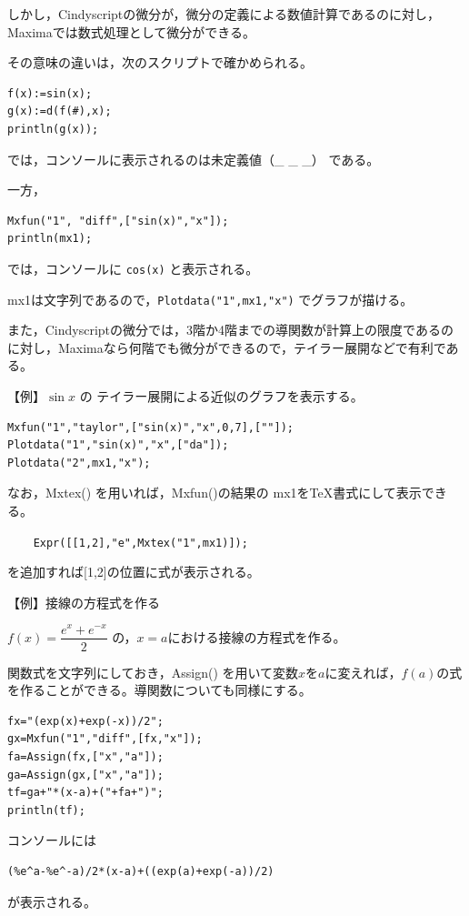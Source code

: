 \documentclass[papersize,a4paper,12pt,uplatex]{jsarticle}
\begin{document}
\begin{description}
しかし，Cindyscriptの微分が，微分の定義による数値計算であるのに対し，Maximaでは数式処理として微分ができる。

その意味の違いは，次のスクリプトで確かめられる。
\begin{verbatim}
f(x):=sin(x);
g(x):=d(f(#),x);
println(g(x));
\end{verbatim}
では，コンソールに表示されるのは未定義値（\_ \_ \_） である。

一方，
\begin{verbatim}
Mxfun("1", "diff",["sin(x)","x"]);
println(mx1);
\end{verbatim}
では，コンソールに \verb|cos(x)| と表示される。

mx1は文字列であるので，\verb|Plotdata("1",mx1,"x")| でグラフが描ける。

また，Cindyscriptの微分では，3階か4階までの導関数が計算上の限度であるのに対し，Maximaなら何階でも微分ができるので，テイラー展開などで有利である。

\vspace{\baselineskip}
【例】$\sin x$ の テイラー展開による近似のグラフを表示する。
\begin{verbatim}
Mxfun("1","taylor",["sin(x)","x",0,7],[""]);
Plotdata("1","sin(x)","x",["da"]);
Plotdata("2",mx1,"x");
\end{verbatim}
\vspace{\baselineskip}
\begin{center}  \end{center}
\vspace{\baselineskip}
なお，Mxtex() を用いれば，Mxfun()の結果の mx1をTeX書式にして表示できる。

\verb|    Expr([[1,2],"e",Mxtex("1",mx1)]);|

を追加すれば[1,2]の位置に式が表示される。

\vspace{\baselineskip}
【例】接線の方程式を作る

\vspace{\baselineskip}
$f(x)=\dfrac{e^x+e^{-x}}{2}$ の，$x=a$における接線の方程式を作る。

関数式を文字列にしておき，Assign() を用いて変数$x$を$a$に変えれば，$f(a)$の式を作ることができる。導関数についても同様にする。

\begin{verbatim}
fx="(exp(x)+exp(-x))/2";
gx=Mxfun("1","diff",[fx,"x"]);
fa=Assign(fx,["x","a"]);
ga=Assign(gx,["x","a"]);
tf=ga+"*(x-a)+("+fa+")";
println(tf);
\end{verbatim}
コンソールには
\begin{verbatim}
(%e^a-%e^-a)/2*(x-a)+((exp(a)+exp(-a))/2) 
\end{verbatim}
が表示される。


\end{description}
\end{document}

